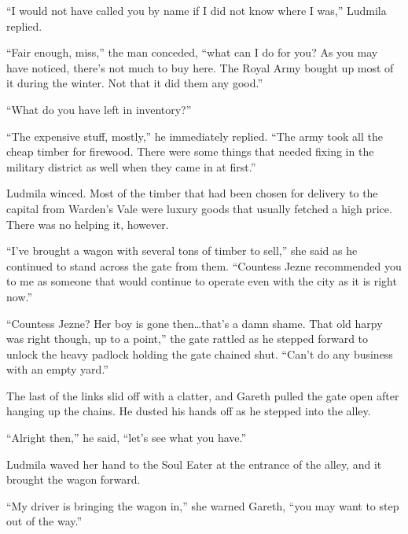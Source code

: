  

“I would not have called you by name if I did not know where I was,” Ludmila replied.

 

“Fair enough, miss,” the man conceded, “what can I do for you? As you may have noticed, there’s not much to buy here. The Royal Army bought up most of it during the winter. Not that it did them any good.”

 

“What do you have left in inventory?”

 

“The expensive stuff, mostly,” he immediately replied. “The army took all the cheap timber for firewood. There were some things that needed fixing in the military district as well when they came in at first.”

 

Ludmila winced. Most of the timber that had been chosen for delivery to the capital from Warden’s Vale were luxury goods that usually fetched a high price. There was no helping it, however.

 

“I’ve brought a wagon with several tons of timber to sell,” she said as he continued to stand across the gate from them. “Countess Jezne recommended you to me as someone that would continue to operate even with the city as it is right now.”

 

“Countess Jezne? Her boy is gone then…that’s a damn shame. That old harpy was right though, up to a point,” the gate rattled as he stepped forward to unlock the heavy padlock holding the gate chained shut. “Can’t do any business with an empty yard.”

 

The last of the links slid off with a clatter, and Gareth pulled the gate open after hanging up the chains. He dusted his hands off as he stepped into the alley.

 

“Alright then,” he said, “let’s see what you have.”

 

Ludmila waved her hand to the Soul Eater at the entrance of the alley, and it brought the wagon forward.

 

“My driver is bringing the wagon in,” she warned Gareth, “you may want to step out of the way.”

 

